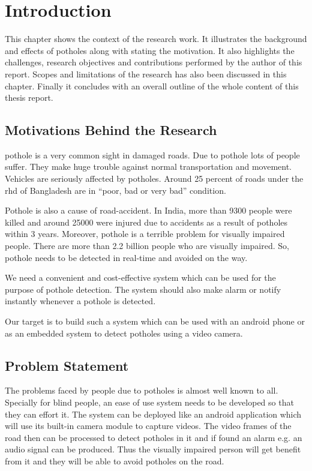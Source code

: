 \chapter{Introduction}

This chapter shows the context of the research work. It illustrates the background and effects of potholes along with stating the motivation. It also highlights the challenges, research objectives and contributions performed by the author of this report. Scopes and limitations of the research has also been discussed in this chapter. Finally it concludes with an overall outline of the whole content of this thesis report.

\section{Motivations Behind the Research}
    \Gls{pothole} is a very common sight in damaged roads. Due to pothole lots of people suffer. They make huge trouble against normal transportation and movement.
    Vehicles are seriously affected by potholes. Around 25 percent of roads under the \acrfull{rhd} of Bangladesh are in ``poor, bad or very bad'' condition\cite{dailystarjul19}.
    
    Pothole is also a cause of road-accident. In India, more than 9300 people were killed and around 25000 were injured due to accidents as a result of potholes within 3 years\cite{indiatodayjul18}.
    Moreover, pothole is a terrible problem for visually impaired people. There are more than 2.2 billion people who are visually impaired\cite{whooct19}.
    So, pothole needs to be detected in real-time and avoided on the way.
    
    \clearpage
    We need a convenient and cost-effective system which can be used for the purpose of pothole detection. The system should also make alarm or notify instantly whenever a pothole is detected.
    
    Our target is to build such a system which can be used with an android phone or as an embedded system to detect potholes using a video camera.
    
\section{Problem Statement}
    The problems faced by people due to potholes is almost well known to all. Specially for blind people, an ease of use system needs to be developed so that they can effort it. The system can be deployed like an android application which will use its built-in camera module to capture videos.
    The video frames of the road then can be processed to detect potholes in it and if found an alarm e.g. an audio signal can be produced. Thus the visually impaired person will get benefit from it and they will be able to avoid potholes on the road.
    
